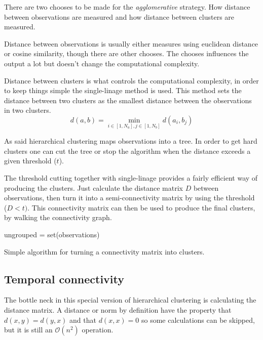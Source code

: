 There are two chooses to be made for the \textit{agglomerative} strategy.  How distance between observations are measured and how distance between clusters are measured.

Distance between observations is usually either measures using euclidean distance or cosine similarity, though there are other chooses. The chooses influences the output a lot but doesn't change the computational complexity.

Distance between clusters is what controls the computational complexity, in order to keep things simple the single-linage method is used. This method sets the distance between two clusters as the smallest distance between the observations in two clusters.
\begin{equation}
d(a, b) = \min_{i \in [1, N_a], j \in [1, N_b]} d(a_i, b_j)
\end{equation}

As said hierarchical clustering maps observations into a tree. In order to get hard clusters one can cut the tree or stop the algorithm when the distance exceeds a given threshold ($t$).

The threshold cutting together with single-linage provides a fairly efficient way of producing the clusters. Just calculate the distance matrix $D$ between observations, then turn it into a semi-connectivity matrix by using the threshold ($D < t)$. This connectivity matrix can then be used to produce the final clusters, by walking the connectivity graph.

\begin{algorithm}[h]
 \DontPrintSemicolon
 ungrouped = set(observations)\;
 \caption{Simple algorithm for turning a connectivity matrix into clusters.}
\end{algorithm}

\subsection{Temporal connectivity}

The bottle neck in this special version of hierarchical clustering is calculating the distance matrix. A distance or norm by definition have the property that $d(x,y) = d(y,x)$ and that $d(x,x) = 0$ so some calculations can be skipped, but it is still an $\mathcal{O}(n^2)$ operation.

